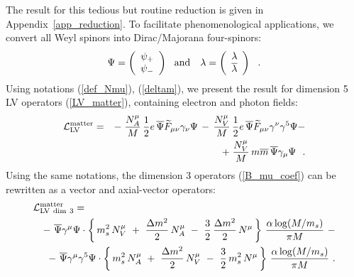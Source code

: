 \documentclass[12pt]{revtex4}
\begin{document}
The result for this tedious but routine reduction
is given in Appendix~\ref{app_reduction}.
To facilitate phenomenological applications, we convert
all Weyl spinors into Dirac/Majorana four-spinors:
\begin{equation}
\label{Dirac_spinors}
   \Psi = \left ( 
                 \begin{array}{c}
                    \psi_+ \\
                    \psi_-
                 \end{array}
          \right ) ~~  {\rm and} ~~~ 
   \lambda = \left (
                 \begin{array}{c}
                    \lambda \\
                    \overline{\lambda}
                 \end{array}
             \right ) ~~.
\end{equation}
      Using notations (\ref{def_Nmu}), (\ref{deltam}), we present the result for dimension 5 
LV operators (\ref{LV_matter}), containing electron and photon fields:
\begin{eqnarray}
\nonumber
   \mathcal{L}_{\rm LV}^{\rm matter} & = &
	-\;
       \frac{N_A^\mu}
              {M} \, \frac{1}{2}e \,
       \overline{\Psi} \widetilde{F}_{\mu\nu}
                       \gamma_\nu \Psi 
     \,-\, 
	\frac{N_V^\mu}
              {M} \, \frac{1}{2}e \,
       \overline{\Psi} \widetilde{F}_{\mu\nu}
                       \gamma^\nu \gamma^5 \Psi - \\
\label{resolved_LV_Dirac}
     && +\;  \frac{N_V^\mu}
                  {M}   \,m \overline{m}\, \overline{\Psi} \gamma_\mu \Psi
     ~~.
\end{eqnarray}
Using the same notations, the dimension 3 operators 
(\ref{B_mu_coef}) can be rewritten as a vector and 
axial-vector operators:
\begin{eqnarray}
\nonumber
\lefteqn{
        \mathcal{L}_{\rm{LV\ dim\ 3}}^{\rm matter} = 
} \\
\nonumber
        &&
-~
\overline{\Psi} \gamma^\mu \Psi \cdot
\left\{\,
         m_s^2\, N_V^\mu 
~+~
 \frac{\Delta m^2}{2}\, N_A^\mu 
~-~
\frac{3}{2}\, \frac{\Delta m^2}{2}\, N^\mu
       \,
\right\}\, \frac{\alpha\log (M/m_s) }{\pi M}
~-
\\
\label{LV_induced_dim3}
&&
-~
\overline{\Psi} \gamma^\mu \gamma^5 \Psi \cdot
\left\{\,
        m_s^2\, N_A^\mu 
~+~
\frac{\Delta m^2}{2}\, N_V^\mu 
~-~
\frac{3}{2}\, m_s^2\, N^\mu
       \,
\right\}\, \frac{\alpha\log (M/m_s)}{\pi M}~.
\end{eqnarray}
\end{document}
